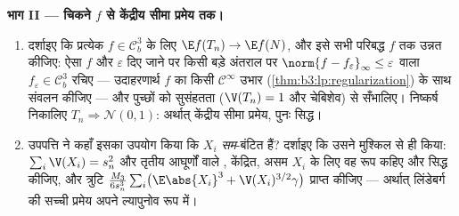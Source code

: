 \begin{problem}[{सप्ताहांत समस्या --- प्रतिस्थापन विधि}]
\medskip
\noindent\textbf{भाग II --- चिकने $f$ से केंद्रीय सीमा प्रमेय
तक।}
\begin{enumerate}[resume]
  \item दर्शाइए कि प्रत्येक $f \in
        \mathcal C_b^3$ के लिए $\E f(T_n) \to \E f(N)$, और इसे सभी परिबद्ध
         $f$ तक उन्नत कीजिए: ऐसा $f$ और $\varepsilon$ दिए जाने पर
        किसी बड़े अंतराल पर
        $\norm{f - f_\varepsilon}_\infty \leq \varepsilon$
        वाला $f_\varepsilon \in \mathcal C^3_b$ रचिए --- उदाहरणार्थ $f$ का किसी $\mathcal C^\infty$ उभार
        (\cref{thm:b3:lp:regularization}) के साथ संवलन कीजिए --- और पुच्छों को सुसंहतता
        ($\V(T_n) = 1$ और चेबिशेव) से सँभालिए। निष्कर्ष निकालिए $T_n \Rightarrow \mathcal N(0, 1)$:
        अर्थात् केंद्रीय सीमा प्रमेय, पुनः सिद्ध।
  \item उपपत्ति ने कहाँ इसका उपयोग किया कि $X_i$ \emph{सम}-बंटित
        हैं? दर्शाइए कि उसने मुश्किल से ही किया: $\sum_i\V(X_i) = s_n^2$ और तृतीय
        आघूर्णों वाले , केंद्रित, असम $X_i$ के लिए वह रूप
        कहिए और सिद्ध कीजिए, और त्रुटि $\frac{M_3}{6s_n^3}\sum_i\bigl(\E\abs{X_i}^3
        + \V(X_i)^{3/2}\gamma\bigr)$ प्राप्त कीजिए ---
        अर्थात् लिंडेबर्ग की सच्ची प्रमेय अपने ल्यापुनोव रूप में।
\end{enumerate}


\end{problem}
